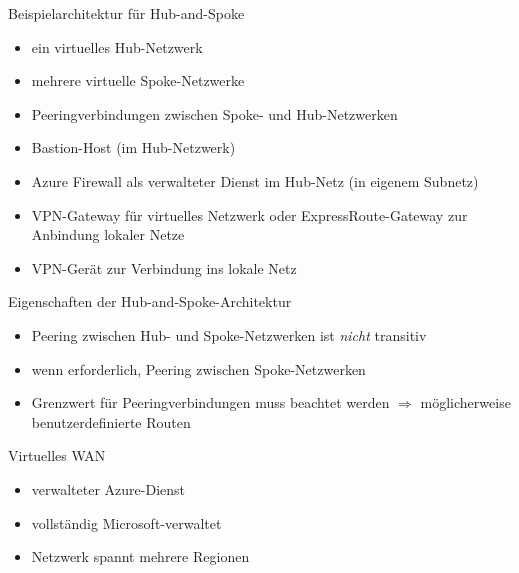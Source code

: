 \begin{flashcard}[]{Beispielarchitektur für Hub-and-Spoke}
  \begin{itemize}
    \item ein virtuelles Hub-Netzwerk
    \item mehrere virtuelle Spoke-Netzwerke
    \item Peeringverbindungen zwischen Spoke- und Hub-Netzwerken
    \item Bastion-Host (im Hub-Netzwerk)
    \item Azure Firewall als verwalteter Dienst im Hub-Netz (in eigenem Subnetz)
    \item VPN-Gateway für virtuelles Netzwerk oder ExpressRoute-Gateway\newline
      zur Anbindung lokaler Netze
    \item VPN-Gerät zur Verbindung ins lokale Netz
  \end{itemize}
\end{flashcard}

\begin{flashcard}[]{Eigenschaften der Hub-and-Spoke-Architektur}
  \begin{itemize}
    \item Peering zwischen Hub- und Spoke-Netzwerken ist \emph{nicht} transitiv
    \item wenn erforderlich, Peering zwischen Spoke-Netzwerken
    \item[!] Grenzwert für Peeringverbindungen muss beachtet werden\newline
      $\Rightarrow$ möglicherweise benutzerdefinierte Routen
  \end{itemize}
\end{flashcard}

\begin{flashcard}[]{Virtuelles WAN}
  \begin{itemize}
    \item verwalteter Azure-Dienst
    \item vollständig Microsoft-verwaltet
    \item Netzwerk spannt mehrere Regionen
  \end{itemize}
\end{flashcard}

